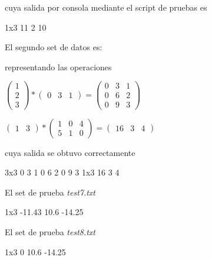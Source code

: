 \documentclass[10pt,a4paper]{article}
\begin{document}
		cuya salida por consola mediante el script de pruebas es
	
		\begin{bash}
		1x3 11 2 10
		\end{bash}
	
		El segundo set de datos es:
		
	
		representando las operaciones
	
		\begin{center}
		$\begin{pmatrix}
		1 \\ 2 \\ 3
		\end{pmatrix}
		*
		\begin{pmatrix}
		0 & 3 & 1
		\end{pmatrix}
		=
		\begin{pmatrix}
		0 & 3 & 1 \\ 0 & 6 & 2 \\ 0 & 9 & 3
		\end{pmatrix}
		$\end{center}
	
		\begin{center}
		$\begin{pmatrix}
		1 & 3
		\end{pmatrix}
		*
		\begin{pmatrix}
		1 & 0 & 4 \\ 5 & 1 & 0
		\end{pmatrix}
		=
		\begin{pmatrix}
		16 & 3 & 4
		\end{pmatrix}
		$\end{center}
	
		cuya salida se obtuvo correctamente
		
		\begin{bash}
		3x3 0 3 1 0 6 2 0 9 3 
		1x3 16 3 4
		\end{bash}

		El set de prueba \textit{test7.txt}
		
		\begin{bash}
		1x3 -11.43 10.6 -14.25 
		\end{bash}

		El set de prueba \textit{test8.txt}
		
		\begin{bash}
		1x3 0 10.6 -14.25 
		\end{bash}
\end{document}
